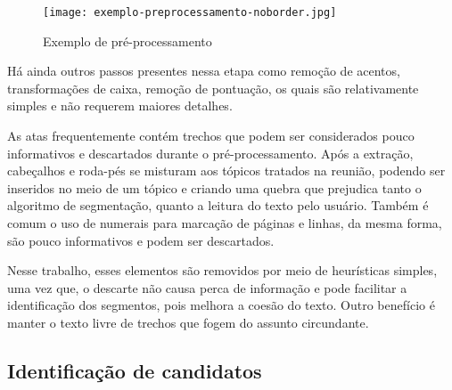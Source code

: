   \begin{figure}[!h]
	\centering
	\texttt{[image: exemplo-preprocessamento-noborder.jpg]}
	\caption{Exemplo de pré-processamento}
	\label{fig:exemplopreprocessamento}
  \end{figure}


Há ainda outros passos presentes nessa etapa como remoção de acentos, transformações de caixa, remoção de pontuação, os quais são relativamente simples e não requerem maiores detalhes.






As atas frequentemente contém trechos que podem ser considerados pouco informativos e descartados durante o pré-processamento. 
Após a extração, cabeçalhos e roda-pés se misturam aos tópicos tratados na reunião, podendo ser  inseridos no meio de um tópico e criando uma quebra que prejudica tanto o algoritmo de segmentação, quanto a leitura do texto pelo usuário.
Também é comum o uso de numerais para marcação de páginas e linhas, da mesma forma, são pouco informativos e podem ser descartados.

Nesse trabalho, esses elementos são removidos por meio de heurísticas simples, uma vez que, o descarte não causa perca de informação e pode facilitar a identificação dos segmentos, pois melhora a coesão do texto. Outro benefício é manter o texto livre de trechos que fogem do assunto circundante.



		



\subsection{Identificação de candidatos}
	\label{subsec:indentificacaosentencas}
	
